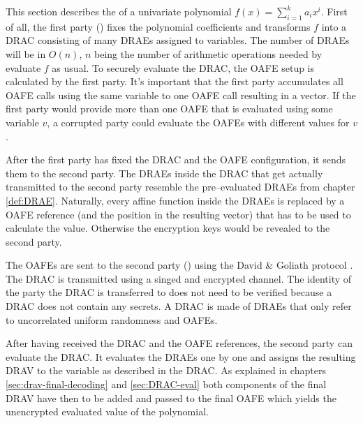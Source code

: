 This section describes the  of a
univariate polynomial $f(x) = \sum_{i=1}^k a_ix^i$. First of all, the first
party (\JWpOne{}) fixes the polynomial coefficients and transforms $f$ into a
DRAC consisting of many DRAEs assigned to variables. The number of DRAEs will be
in $O(n)$, $n$ being the number of arithmetic operations needed by evaluate
$f$ as usual. To securely evaluate the DRAC, the OAFE setup is calculated by
the first party. It's important that the first party accumulates all OAFE calls
using the same variable to one OAFE call resulting in a vector. If the first
party would provide more than one OAFE that is evaluated using some variable
$v$, a corrupted party could evaluate the OAFEs with different values for $v$.

After the first party has fixed the DRAC and the OAFE configuration, it sends
them to the second party. The DRAEs inside the DRAC that get actually
transmitted to the second party resemble the pre--evaluated DRAEs from chapter
\ref{def:DRAE}. Naturally, every affine function inside the DRAEs is replaced by
a OAFE reference (and the position in the resulting vector) that has to be used
to calculate the value. Otherwise the encryption keys would be revealed to the
second party.

The OAFEs are sent to the second party (\JWpTwo{}) using the David \& Goliath
protocol \cite{davidgoliath}. The DRAC is transmitted using a singed and
encrypted channel. The identity of the party the DRAC is transferred to does not
need to be verified because a DRAC does not contain any secrets. A DRAC is made
of DRAEs that only refer to uncorrelated uniform randomness and OAFEs.

After having received the DRAC and the OAFE references, the second party can
evaluate the DRAC. It evaluates the DRAEs one by one and assigns the resulting
DRAV to the variable as described in the DRAC. As explained in chapters
\ref{sec:drav-final-decoding} and \ref{sec:DRAC-eval} both components of the
final DRAV have then to be added and passed to the final OAFE which yields the
unencrypted evaluated value of the polynomial.


%
%
\label{sec:example}



